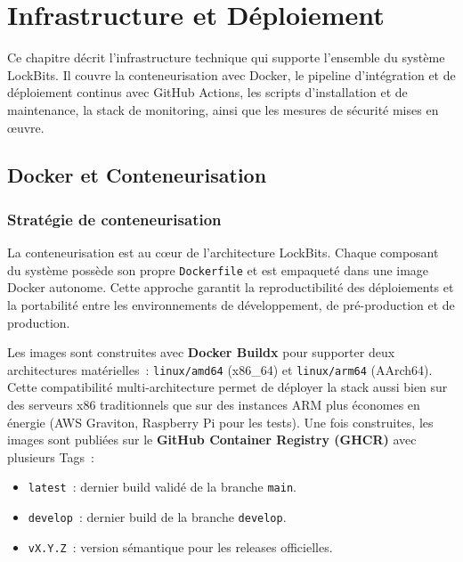 
\chapter{Infrastructure et Déploiement}

Ce chapitre décrit l'infrastructure technique qui supporte l'ensemble du
système LockBits. Il couvre la conteneurisation avec Docker, le pipeline
d'intégration et de déploiement continus avec GitHub Actions, les scripts
d'installation et de maintenance, la stack de monitoring, ainsi que les
mesures de sécurité mises en œuvre.

\section{Docker et Conteneurisation}

\subsection{Stratégie de conteneurisation}

La conteneurisation est au cœur de l'architecture LockBits. Chaque composant du
système possède son propre \texttt{Dockerfile} et est empaqueté dans une image
Docker autonome. Cette approche garantit la reproductibilité des déploiements
et la portabilité entre les environnements de développement, de pré-production
et de production.

Les images sont construites avec \textbf{Docker Buildx} pour supporter deux
architectures matérielles~: \texttt{linux/amd64} (x86\_64) et
\texttt{linux/arm64} (AArch64). Cette compatibilité multi-architecture permet
de déployer la stack aussi bien sur des serveurs x86 traditionnels que sur des
instances ARM plus économes en énergie (AWS Graviton, Raspberry Pi pour les
tests). Une fois construites, les images sont publiées sur le \textbf{GitHub
Container Registry (GHCR)} avec plusieurs Tags~:

\begin{itemize}
  \item \texttt{latest}~: dernier build validé de la branche \texttt{main}.
  \item \texttt{develop}~: dernier build de la branche \texttt{develop}.
  \item \texttt{vX.Y.Z}~: version sémantique pour les releases officielles.
\end{itemize}

